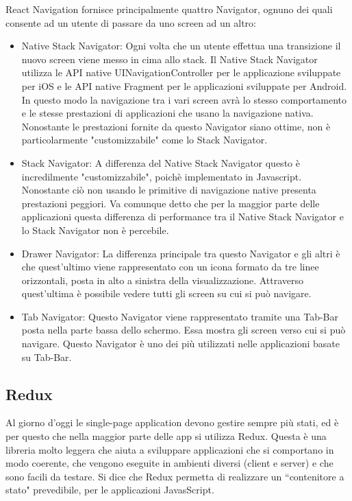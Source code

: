 React Navigation fornisce principalmente quattro Navigator\cite{ReactNavigation}, ognuno dei quali consente ad un utente di passare da uno screen ad un altro:
\begin{itemize}
      \item Native Stack Navigator: Ogni volta che un utente effettua una transizione
            il nuovo screen viene messo in cima allo stack. Il Native Stack Navigator utilizza le API native UINavigationController per le applicazione sviluppate per iOS e le API native Fragment per le
            applicazioni sviluppate per Android. \\In questo modo la navigazione tra i vari screen avr\`a lo stesso comportamento e le stesse prestazioni
            di applicazioni che usano la navigazione nativa. Nonostante le prestazioni fornite da questo Navigator siano ottime, non \`e particolarmente "customizzabile"
            come lo Stack Navigator.
      \item Stack Navigator: A differenza del Native Stack Navigator questo \`e incredilmente "customizzabile", poich\`e implementato in Javascript. Nonostante ci\`o non usando le primitive di navigazione native
            presenta prestazioni peggiori. Va comunque detto che per la maggior parte delle applicazioni questa differenza di performance tra il Native Stack Navigator e lo Stack Navigator non \`e percebile.
      \item Drawer Navigator: La differenza principale tra questo Navigator e gli altri \`e che quest'ultimo viene rappresentato con un icona formato da tre linee orizzontali, posta in alto a sinistra della visualizzazione. Attraverso
            quest'ultima \`e possibile vedere tutti gli screen su cui si pu\`o navigare.
      \item Tab Navigator: Questo Navigator viene rappresentato tramite una Tab-Bar posta nella parte bassa dello schermo. Essa mostra gli screen verso cui si
            pu\`o navigare. Questo Navigator \`e uno dei pi\`u utilizzati nelle applicazioni basate su Tab-Bar.
\end{itemize}


\subsection{Redux}

Al giorno d'oggi le single-page application devono gestire sempre pi\`u stati, ed \`e per questo che nella maggior parte delle app
si utilizza Redux. Questa \`e una libreria molto leggera che aiuta a sviluppare applicazioni che si comportano in modo coerente, che vengono eseguite in
ambienti diversi (client e server) e che sono facili da testare. Si dice che Redux permetta di realizzare un ``contenitore a stato" prevedibile, per le applicazioni JavasScript.

